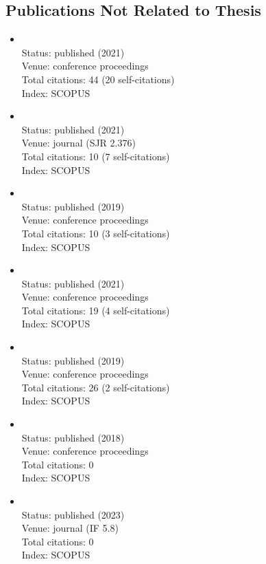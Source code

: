 \begin{refsection}
\newpage
\section*{Publications Not Related to Thesis}
    \begin{itemize}
		\item{}\vspace{2mm}\\Status: published (2021)\\Venue: conference proceedings\\Total citations: 44 (20 self-citations)\\Index: SCOPUS
		\item{}\vspace{2mm}\\Status: published (2021)\\Venue: journal (SJR 2.376)\\Total citations: 10 (7 self-citations)\\Index: SCOPUS
		\item{}\vspace{2mm}\\Status: published (2019)\\Venue: conference proceedings\\Total citations: 10 (3 self-citations)\\Index: SCOPUS
		\item{}\vspace{2mm}\\Status: published (2021)\\Venue: conference proceedings\\Total citations: 19 (4 self-citations)\\Index: SCOPUS
		\item{}\vspace{2mm}\\Status: published (2019)\\Venue: conference proceedings\\Total citations: 26 (2 self-citations)\\Index: SCOPUS
		\item{}\vspace{2mm}\\Status: published (2018)\\Venue: conference proceedings\\Total citations: 0\\Index: SCOPUS
		\item{}\vspace{2mm}\\Status: published (2023)\\Venue: journal (IF 5.8)\\Total citations: 0\\Index: SCOPUS

\end{itemize}
\end{refsection}
